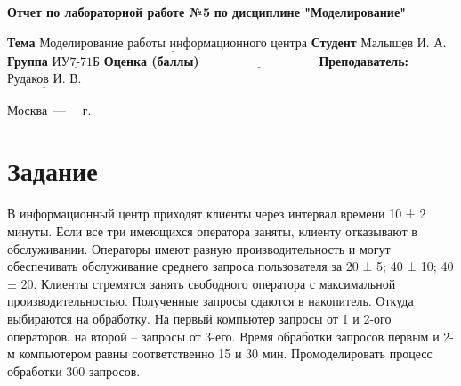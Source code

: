 \documentclass[14pt]{extreport}
\begin{document}
\begin{titlepage}
		
		\begin{center}
			\noindent\begin{minipage}{1.3\textwidth}\centering
				\Large\textbf{  Отчет по лабораторной работе №5}\newline
				\textbf{по дисциплине \newline "Моделирование"}\newline\newline
			\end{minipage}
		\end{center}
		
		\noindent\textbf{Тема} $\underline{\text{Моделирование работы информационного центра}}$\newline\newline
		\noindent\textbf{Студент} $\underline{\text{Малышев И. А.}}$\newline\newline
		\noindent\textbf{Группа} $\underline{\text{ИУ7-71Б}}$\newline\newline
		\noindent\textbf{Оценка (баллы)} $\underline{\text{~~~~~~~~~~~~~~~~~~~~~~~~~~~}}$\newline\newline
		\noindent\textbf{Преподаватель: } $\underline{\text{Рудаков И. В.}}$\newline\newline\newline
		
		\begin{center}
			\vfill
			Москва~---~\the\year
			~г.
		\end{center}
	\end{titlepage}
	
	
	\setcounter{page}{2}

\chapter{Задание}

В информационный центр приходят клиенты через интервал времени 10 ± 2 минуты. Если все три имеющихся оператора заняты, клиенту отказывают в обслуживании. Операторы имеют разную производительность и могут обеспечивать обслуживание среднего запроса пользователя за 20 ± 5; 40 ± 10; 40 ± 20. Клиенты стремятся занять свободного оператора с максимальной производительностью. Полученные запросы сдаются в накопитель. Откуда выбираются на обработку. На первый компьютер запросы от 1 и 2-ого операторов, на второй -- запросы от 3-его. Время обработки запросов первым и 2- м компьютером равны соответственно 15 и 30 мин. Промоделировать процесс обработки 300 запросов.
\end{document}

